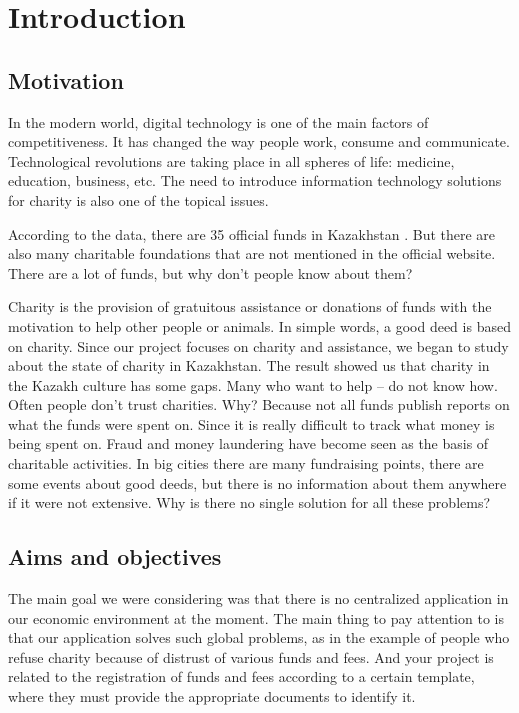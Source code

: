 \chapter{Introduction}\label{ch:intro}
\section{Motivation}
In the modern world, digital technology is one of the main factors of competitiveness. It has changed the way people work, consume and communicate. Technological revolutions are taking place in all spheres of life: medicine, education, business, etc. The need to introduce information technology solutions for charity is also one of the topical issues.

According to the data, there are 35 official funds in Kazakhstan \cite{Egov}. But there are also many charitable foundations that are not mentioned in the official website. There are a lot of funds, but why don't people know about them? 

Charity is the provision of gratuitous assistance or donations of funds with the motivation to help other people or animals. In simple words, a good deed is based on charity. Since our project focuses on charity and assistance, we began to study about the state of charity in Kazakhstan. \cite{lawRk} The result showed us that charity in the Kazakh culture has some gaps. Many who want to help – do not know how. Often people don't trust charities. Why? Because not all funds publish reports on what the funds were spent on. Since it is really difficult to track what money is being spent on. Fraud and money laundering have become seen as the basis of charitable activities. In big cities there are many fundraising points, there are some events about good deeds, but there is no information about them anywhere if it were not extensive. Why is there no single solution for all these problems?

\newpage
\section{Aims and objectives}
The main goal we were considering was that there is no centralized application in our economic environment at the moment. The main thing to pay attention to is that our application solves such global problems, as in the example of people who refuse charity because of distrust of various funds and fees. And your project is related to the registration of funds and fees according to a certain template, where they must provide the appropriate documents to identify it.

